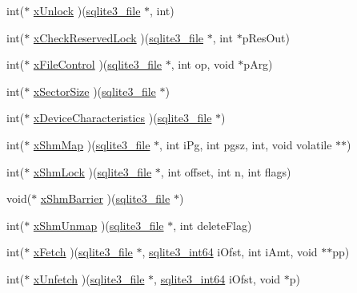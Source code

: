 \begin{DoxyCompactItemize}
\item 
int($\ast$ \hyperlink{structsqlite3__io__methods_a8029cb982202ac5d08f5a556f3b3d49b}{x\+Unlock} )(\hyperlink{structsqlite3__file}{sqlite3\+\_\+file} $\ast$, int)
\item 
int($\ast$ \hyperlink{structsqlite3__io__methods_a5eb19302e4f81de062ae2f589d3c5955}{x\+Check\+Reserved\+Lock} )(\hyperlink{structsqlite3__file}{sqlite3\+\_\+file} $\ast$, int $\ast$p\+Res\+Out)
\item 
int($\ast$ \hyperlink{structsqlite3__io__methods_a6ef23eda890920cc3fe586fc9ef1f7b1}{x\+File\+Control} )(\hyperlink{structsqlite3__file}{sqlite3\+\_\+file} $\ast$, int op, void $\ast$p\+Arg)
\item 
int($\ast$ \hyperlink{structsqlite3__io__methods_a355a7a9ee3b728f7c3976130d24774bd}{x\+Sector\+Size} )(\hyperlink{structsqlite3__file}{sqlite3\+\_\+file} $\ast$)
\item 
int($\ast$ \hyperlink{structsqlite3__io__methods_a224cdced99e3c80391ccf1ffab06562f}{x\+Device\+Characteristics} )(\hyperlink{structsqlite3__file}{sqlite3\+\_\+file} $\ast$)
\item 
int($\ast$ \hyperlink{structsqlite3__io__methods_a4a778f17a45f083829497b3b73109b9c}{x\+Shm\+Map} )(\hyperlink{structsqlite3__file}{sqlite3\+\_\+file} $\ast$, int i\+Pg, int pgsz, int, void volatile $\ast$$\ast$)
\item 
int($\ast$ \hyperlink{structsqlite3__io__methods_a5e9791b765f3aa8408609e2e1dfd72ff}{x\+Shm\+Lock} )(\hyperlink{structsqlite3__file}{sqlite3\+\_\+file} $\ast$, int offset, int n, int flags)
\item 
void($\ast$ \hyperlink{structsqlite3__io__methods_a4244835846045ff9b5073e0fcf801d4f}{x\+Shm\+Barrier} )(\hyperlink{structsqlite3__file}{sqlite3\+\_\+file} $\ast$)
\item 
int($\ast$ \hyperlink{structsqlite3__io__methods_a41473897455cc3cd850549aee3bcd172}{x\+Shm\+Unmap} )(\hyperlink{structsqlite3__file}{sqlite3\+\_\+file} $\ast$, int delete\+Flag)
\item 
int($\ast$ \hyperlink{structsqlite3__io__methods_a43839d292caa91c4055d068ebb740aae}{x\+Fetch} )(\hyperlink{structsqlite3__file}{sqlite3\+\_\+file} $\ast$, \hyperlink{sqlite3_8c_a0a4d3e6c1ad46f90e746b920ab6ca0d2}{sqlite3\+\_\+int64} i\+Ofst, int i\+Amt, void $\ast$$\ast$pp)
\item 
int($\ast$ \hyperlink{structsqlite3__io__methods_a2c4ce3c8b28c5a4089bdc032f0b9c30c}{x\+Unfetch} )(\hyperlink{structsqlite3__file}{sqlite3\+\_\+file} $\ast$, \hyperlink{sqlite3_8c_a0a4d3e6c1ad46f90e746b920ab6ca0d2}{sqlite3\+\_\+int64} i\+Ofst, void $\ast$p)
\end{DoxyCompactItemize}


